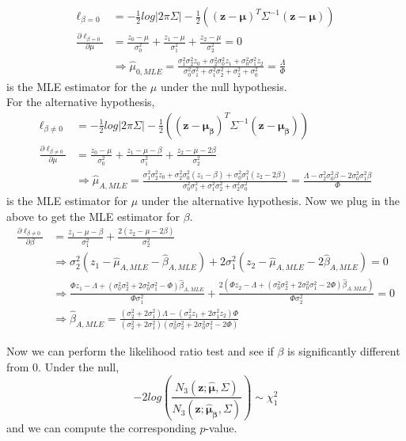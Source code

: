 \documentclass[11pt]{article}
\begin{document}
\begin{align}
\ell_{\beta = 0} &= -\frac{1}{2} log |2\pi \Sigma| -\frac{1}{2} ((\bm{z}-\bm{\mu})^T \Sigma^{-1}(\bm{z}-\bm{\mu}))\\
\frac{\partial \ell_{\beta = 0}}{\partial \mu} &= \frac{z_0 -\mu}{\sigma_0^2} + \frac{z_1-\mu}{\sigma_1^2} + \frac{z_2-\mu}{\sigma_2^2} = 0\\
&\Rightarrow \hat{\mu}_{0,MLE} = \frac{\sigma_1^2 \sigma_2^2 z_0 + 
\sigma_2^2 \sigma_0^2 z_1 + \sigma_0^2 \sigma_1^2 z_2
}{\sigma_0^2 \sigma_1^2 + \sigma_1^2 \sigma_2^2 + \sigma_2^2 + \sigma_0^2} = \frac{\Lambda}{\Phi}
\end{align}
\noindent is the MLE estimator for the $\mu$ under the null hypothesis. \\

\noindent For the alternative hypothesis, 
\begin{align*}
\ell_{\beta \neq 0}&= -\frac{1}{2} log|2\pi\Sigma| - \frac{1}{2} ((\bm{z}-\bm{\mu_{\beta}})^T \Sigma^{-1} (\bm{z}-\bm{\mu_{\beta}}))\\
\frac{\partial \ell_{\beta \neq 0}}{\partial \mu} &=
\frac{z_0 - \mu}{\sigma_0^2}+ \frac{z_1 - \mu - \beta}{\sigma_1^2} + \frac{z_2-\mu-2\beta}{\sigma_2^2}\\
&\Rightarrow \hat{\mu}_{A,MLE} = \frac{\sigma_1^2 \sigma_2^2 z_0 + 
\sigma_2^2 \sigma_0^2 (z_1-\beta) + \sigma_0^2 \sigma_1^2 (z_2-2\beta)
}{\sigma_0^2 \sigma_1^2 + \sigma_1^2 \sigma_2^2 + \sigma_2^2 \sigma_0^2} = \frac{\Lambda - \sigma_2^2 \sigma_0^2 \beta - 2\sigma_0^2 \sigma_1^2 \beta}{\Phi}
\end{align*}
\noindent is the MLE estimator for $\mu$ under the alternative hypothesis. Now we plug in the above to get the MLE estimator for $\beta$. 
\begin{align*}
\frac{\partial \ell_{\beta \neq 0}}{\partial \beta} &= \frac{z_1-\mu-\beta}{\sigma_1^2} + \frac{2(z_2-\mu-2\beta)}{\sigma_2^2}\\
&\Rightarrow  \sigma_2^2(z_1-\hat{\mu}_{A,MLE}-\hat{\beta}_{A,MLE}) + 2\sigma_1^2 (z_2-\hat{\mu}_{A,MLE}-2\hat{\beta}_{A,MLE}) = 0\\
&\Rightarrow \frac{
\Phi z_1 - \Lambda + (\sigma_0^2 \sigma_2^2 + 2\sigma_0^2 \sigma_1^2 -\Phi) \hat{\beta}_{A,MLE}
}{\Phi \sigma_1^2} + \frac{
2(
\Phi z_2 - \Lambda + (\sigma_0^2 \sigma_2^2 + 2\sigma_0^2 \sigma_1^2 - 2\Phi) \hat{\beta}_{A,MLE}
)}{\Phi \sigma_2^2} = 0\\
&\Rightarrow \hat{\beta}_{A,MLE} = \frac{
(\sigma_2^2 + 2\sigma_1^2)\Lambda - (\sigma_2^2 z_1 + 2\sigma_1^2 z_2) \Phi
}{
(\sigma_2^2 + 2\sigma_1^2) (\sigma_0^2 \sigma_2^2 + 2\sigma_0^2 \sigma_1^2 - 2\Phi)
}
\end{align*}

\noindent Now we can perform the likelihood ratio test and see if $\beta$ is significantly different from $0$. Under the null,
$$-2log \left(
\frac{N_3(\bm{z}; \bm{\hat{\mu}}, \Sigma)}{N_3(\bm{z}; \bm{\hat{\mu}_{\beta}}, \Sigma)}
\right)\sim \chi_1^2$$
and we can compute the corresponding $p$-value.
\end{document}
